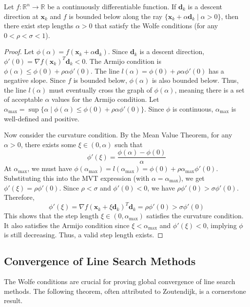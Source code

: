 \documentclass{MathNote}
\begin{document}
\begin{lemma}\label{lemma:wolfe_existence}
	Let $f: \mathbb{R}^n \to \mathbb{R}$ be a continuously differentiable function. If $\bm{d}_k$ is a descent direction at $\bm{x}_k$ and $f$ is bounded below along the ray $\{\bm{x}_k + \alpha \bm{d}_k \mid \alpha > 0\}$, then there exist step lengths $\alpha > 0$ that satisfy the Wolfe conditions (for any $0 < \rho < \sigma < 1$).
\end{lemma}
\begin{proof}
	Let $\phi(\alpha) = f(\bm{x}_k + \alpha \bm{d}_k)$. Since $\bm{d}_k$ is a descent direction, $\phi'(0) = \nabla f(\bm{x}_k)^T \bm{d}_k < 0$. The Armijo condition is $\phi(\alpha) \le \phi(0) + \rho \alpha \phi'(0)$.
	The line $l(\alpha) = \phi(0) + \rho \alpha \phi'(0)$ has a negative slope. Since $f$ is bounded below, $\phi(\alpha)$ is also bounded below. Thus, the line $l(\alpha)$ must eventually cross the graph of $\phi(\alpha)$, meaning there is a set of acceptable $\alpha$ values for the Armijo condition. Let $\alpha_{\max} = \sup\{\alpha \mid \phi(\alpha) \le \phi(0) + \rho \alpha \phi'(0)\}$. Since $\phi$ is continuous, $\alpha_{\max}$ is well-defined and positive.
	
	Now consider the curvature condition. By the Mean Value Theorem, for any $\alpha > 0$, there exists some $\xi \in (0, \alpha)$ such that
	$$ \phi'(\xi) = \frac{\phi(\alpha) - \phi(0)}{\alpha} $$
	At $\alpha_{\max}$, we must have $\phi(\alpha_{\max}) = l(\alpha_{\max}) = \phi(0) + \rho \alpha_{\max} \phi'(0)$.
	Substituting this into the MVT expression (with $\alpha = \alpha_{\max}$), we get $\phi'(\xi) = \rho \phi'(0)$.
	Since $\rho < \sigma$ and $\phi'(0) < 0$, we have $\rho \phi'(0) > \sigma \phi'(0)$. Therefore,
	$$ \phi'(\xi) = \nabla f(\bm{x}_k + \xi \bm{d}_k)^T \bm{d}_k = \rho \phi'(0) > \sigma \phi'(0) $$
	This shows that the step length $\xi \in (0, \alpha_{\max})$ satisfies the curvature condition. It also satisfies the Armijo condition since $\xi < \alpha_{\max}$ and $\phi'(\xi) < 0$, implying $\phi$ is still decreasing. Thus, a valid step length exists.
\end{proof}

\subsection{Convergence of Line Search Methods}

The Wolfe conditions are crucial for proving global convergence of line search methods. The following theorem, often attributed to Zoutendijk, is a cornerstone result.
\end{document}
